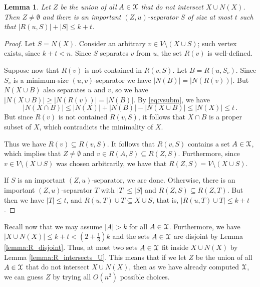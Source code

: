 \documentclass[a4paper,11pt]{article}
\newtheorem{lemma}[theorem]{Lemma}
\theoremstyle{definition}
\theoremstyle{remark}
\newcommand{\X}{\EuScript{X}}
\newcommand{\card}[1]{\left\lvert {#1} \right\rvert}
\newcommand{\vbound}[1]{\card{N(#1)}}
\begin{document}
\begin{lemma}\label{lemma:finding_solution}
Let $Z$ be the union of all $A \in \X$ that do not intersect $X \cup N(X)$. Then $Z \not= \emptyset$ and there is an important $(Z,u)$-separator $S$ of size at most $t$ such that $\card{R(u,S)} + \card{S} \le k + t$.
\end{lemma}

\begin{proof}
Let $S = N(X)$. Consider an arbitrary $v \in V \setminus (X \cup S)$; such vertex exists, since $k + t < n$. Since $S$ separates $v$ from $u$, the set $R(v)$ is well-defined.

Suppose now that $R(v)$ is not contained in $R(v,S)$. Let $B = R(u,S_v)$. Since $S_v$ is a minimum-size $(u,v)$-separator we have $\vbound{B} = \vbound{R(v)}$. But $N(X \cup B)$ also separates $u$ and $v$, so we have $\vbound{X \cup B} \ge \vbound{R(v)} = \vbound{B}$. By \eqref{eq:vsubm}, we have
\[ \vbound{X \cap B} \le \vbound{X} + \vbound{B} - \vbound{ X \cup B} \le \vbound{X} \le t\,.\]
But since $R(v)$ is not contained $R(v,S)$, it follows that $X \cap B$ is a proper subset of $X$, which contradicts the minimality of $X$.

Thus we have $R(v) \subseteq R(v,S)$. It follows that $R(v,S)$ contains a set $A \in \X$, which implies that $Z \not= \emptyset$ and $v \in R(A,S) \subseteq R(Z,S)$. Furthermore, since $v \in V \setminus (X \cup S)$ was chosen arbitrarily, we have that $R(Z,S) = V \setminus (X \cup S)$.

If $S$ is an important $(Z,u)$-separator, we are done. Otherwise, there is an important $(Z,u)$-separator $T$ with $\card{T} \le \card{S}$ and $R(Z,S) \subseteq R(Z,T)$. But then we have $\card{T} \le t$, and $R(u,T) \cup T \subseteq X \cup S$, that is, $\card{R(u,T) \cup T} \le k + t$.
\end{proof}

Recall now that we may assume $\card{A} > k$ for all $A \in \X$. Furthermore, we have $\card{X \cup N(X)} \le k + t < \left(2 + \frac{1}{3}\right) k$ and the sets $A \in \X$ are disjoint by Lemma \ref{lemma:R_disjoint}. Thus, at most two sets $A \in \X$ fit inside $X \cup N(X)$ by Lemma \ref{lemma:R_intersects_U}. This means that if we let $Z$ be the union of all $A \in \X$ that do not intersect $X \cup N(X)$, then as we have already computed $\X$, we can guess $Z$ by trying all $O(n^2)$ possible choices.
\end{document}
